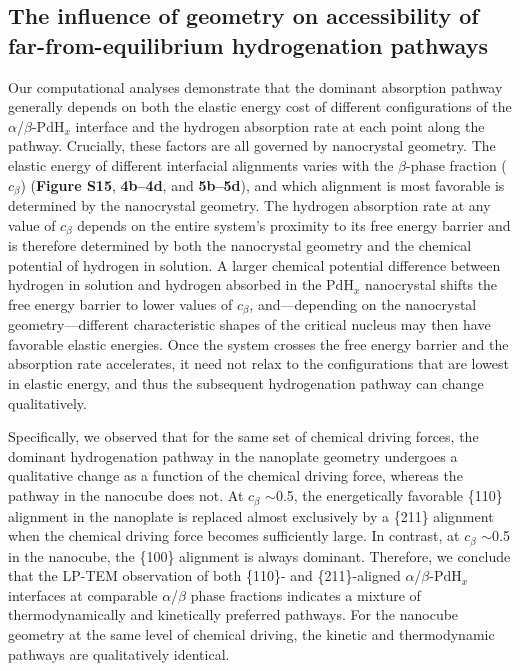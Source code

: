 \documentclass[reprint,amsmath,amssymb,aip,nofootinbib, citeautoscript,]{revtex4-2}
\begin{document}
\subsection*{The influence of geometry on accessibility of far-from-equilibrium hydrogenation pathways}

Our computational analyses demonstrate that the dominant absorption pathway generally depends on both the elastic energy cost of different configurations of the $\alpha$/$\beta$-$\mathrm{PdH}_x$ interface and the hydrogen absorption rate at each point along the pathway. Crucially, these factors are all governed by nanocrystal geometry. The elastic energy of different interfacial alignments varies with the $\beta$-phase fraction ($c_\beta$) (\textbf{Figure S15}, \textbf{4b–4d}, and \textbf{5b–5d}), and which alignment is most favorable is determined by the nanocrystal geometry. The hydrogen absorption rate at any value of $c_\beta$ depends on the entire system’s proximity to its free energy barrier and is therefore determined by both the nanocrystal geometry and the chemical potential of hydrogen in solution. A larger chemical potential difference between hydrogen in solution and hydrogen absorbed in the $\mathrm{PdH}_x$ nanocrystal shifts the free energy barrier to lower values of $c_\beta$, and—depending on the nanocrystal geometry—different characteristic shapes of the critical nucleus may then have favorable elastic energies. Once the system crosses the free energy barrier and the absorption rate accelerates, it need not relax to the configurations that are lowest in elastic energy, and thus the subsequent hydrogenation pathway can change qualitatively.


Specifically, we observed that for the same set of chemical driving forces, the dominant hydrogenation pathway in the nanoplate geometry undergoes a qualitative change as a function of the chemical driving force, whereas the pathway in the nanocube does not. At $c_\beta$ $\sim$0.5, the energetically favorable \{110\} alignment in the nanoplate is replaced almost exclusively by a \{211\} alignment when the chemical driving force becomes sufficiently large. In contrast, at $c_\beta$ $\sim$0.5 in the nanocube, the \{100\} alignment is always dominant. Therefore, we conclude that the LP-TEM observation of both \{110\}- and \{211\}-aligned $\alpha$/$\beta$-$\mathrm{PdH}_x$ interfaces at comparable $\alpha$/$\beta$ phase fractions indicates a mixture of thermodynamically and kinetically preferred pathways. For the nanocube geometry at the same level of chemical driving, the kinetic and thermodynamic pathways are qualitatively identical.
\end{document}
